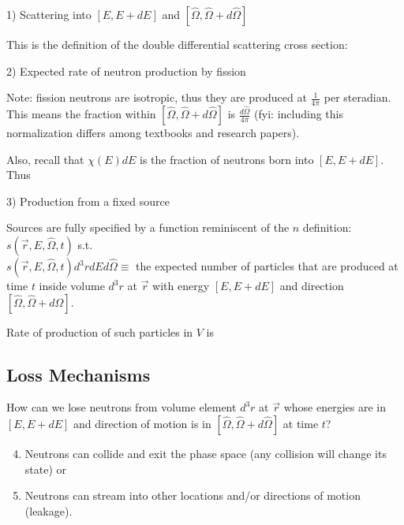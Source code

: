 \documentclass[12pt]{article}
\newif\ifeqns
\newcommand{\vOmega}{\ensuremath{\hat{\Omega}}}
\begin{document}
1) Scattering into $[E, E + dE]$ and $[\vOmega, \vOmega + d\vOmega]$

This is the definition of the double differential scattering cross section:
\ifeqns
\[\boxed{\Bigl[\int_V d^3r \int_{4\pi} d\vOmega' \int_0^{\infty} dE' \: \Sigma_s(E', \vOmega' \rightarrow E, \vOmega) v' n(\vec{r}, E', \vOmega', t) \Bigr] dE d\vOmega}\]
\else
\vspace*{3em}
\fi

2) Expected rate of neutron production by fission

Note: fission neutrons are isotropic, thus they are produced at $\frac{1}{4\pi}$ per steradian. This means the fraction within $[\vOmega, \vOmega + d\vOmega]$ is $\frac{d\vOmega}{4\pi}$ (fyi: including this normalization differs among textbooks and research papers).

Also, recall that $\chi(E)dE$ is the fraction of neutrons born into $[E, E + dE]$. Thus
%
\ifeqns
\[\boxed{\frac{\chi(E)}{4\pi}\Bigl[\int_V d^3r \int_{4\pi} d\vOmega' \int_0^{\infty} dE' \: \nu(E') \Sigma_f(E') v' n(\vec{r}, E', \vOmega', t) \Bigr] dE d\vOmega}\]
\else
\vspace*{3em}
\fi

3) Production from a fixed source

Sources are fully specified by a function reminiscent of the $n$ definition: $s(\vec{r}, E, \vOmega, t)$ s.t.\ \\$s(\vec{r}, E, \vOmega, t)d^3rdEd\vOmega \equiv$ the expected number of particles that are produced at time $t$ inside volume $d^3r$ at $\vec{r}$ with energy $[E, E + dE]$ and direction $[\vOmega, \vOmega + d\vOmega]$.

Rate of production of such particles in $V$ is
\ifeqns
\[\boxed{\Bigl[\int_V d^3r \:s(\vec{r}, E, \vOmega, t) \Bigr] dE d\vOmega }\]
\else
\vspace*{2.5em}
\fi

\subsection*{Loss Mechanisms}
How can we lose neutrons from volume element $d^3r$ at $\vec{r}$ whose energies are in $[E, E + dE]$ and direction of motion is in $[\vOmega, \vOmega + d\vOmega]$ at time $t$?
%
\begin{enumerate}
\setcounter{enumi}{3}
\item Neutrons can collide and exit the phase space (any collision will change its state) or
\item Neutrons can stream into other locations and/or directions of motion (leakage).
\end{enumerate}
\end{document}
